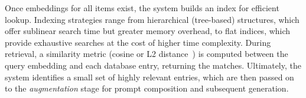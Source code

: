 Once embeddings for all items exist, the system builds an index for efficient lookup. 
Indexing strategies range from hierarchical (tree-based) structures, which offer sublinear search time but greater memory overhead, to flat indices, which provide exhaustive searches at the cost of higher time complexity.
During retrieval, a similarity metric (cosine or L2 distance~\cite{l2}) 
is computed between the query embedding and each database entry, returning the \topk{}matches. 
Ultimately, the system identifies a small set of highly relevant entries, which are then passed on to the \emph{augmentation} stage for prompt composition and subsequent generation.




